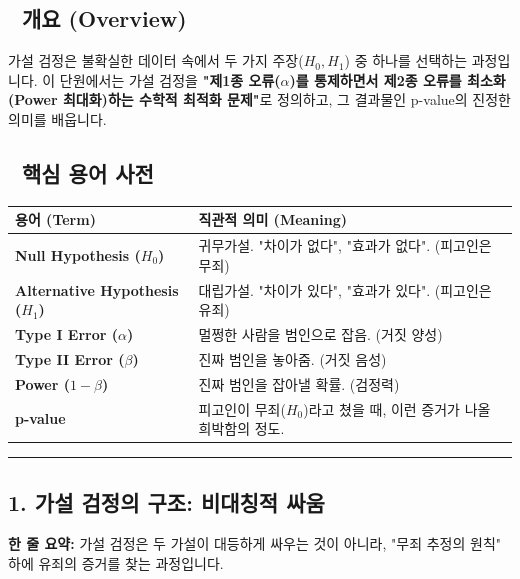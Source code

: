 \documentclass[11pt,a4paper]{book}
\theoremstyle{definition}
\begin{document}
\subsection*{📌 개요 (Overview)}
가설 검정은 불확실한 데이터 속에서 두 가지 주장($H_0, H_1$) 중 하나를 선택하는 과정입니다. 이 단원에서는 가설 검정을 \textbf{"제1종 오류($\alpha$)를 통제하면서 제2종 오류를 최소화(Power 최대화)하는 수학적 최적화 문제"}로 정의하고, 그 결과물인 p-value의 진정한 의미를 배웁니다.

\subsection*{📝 핵심 용어 사전}
\begin{table}[h]
\centering
\begin{tabularx}{\textwidth}{|p{}|X|}
\hline
\textbf{용어 (Term)} & \textbf{직관적 의미 (Meaning)} \\
\hline
\textbf{Null Hypothesis ($H_0$)} & 귀무가설. "차이가 없다", "효과가 없다". (피고인은 무죄) \\
\hline
\textbf{Alternative Hypothesis ($H_1$)} & 대립가설. "차이가 있다", "효과가 있다". (피고인은 유죄) \\
\hline
\textbf{Type I Error ($\alpha$)} & 멀쩡한 사람을 범인으로 잡음. (거짓 양성) \\
\hline
\textbf{Type II Error ($\beta$)} & 진짜 범인을 놓아줌. (거짓 음성) \\
\hline
\textbf{Power ($1-\beta$)} & 진짜 범인을 잡아낼 확률. (검정력) \\
\hline
\textbf{p-value} & 피고인이 무죄($H_0$)라고 쳤을 때, 이런 증거가 나올 희박함의 정도. \\
\hline
\end{tabularx}
\end{table}

\vspace{0.5cm}\hrule\vspace{0.5cm}

\subsection{1. 가설 검정의 구조: 비대칭적 싸움}

\begin{conceptbox}[title={개념 1: 법정 공방 (Courtroom Trial)}]
\textbf{한 줄 요약:} 가설 검정은 두 가설이 대등하게 싸우는 것이 아니라, "무죄 추정의 원칙" 하에 유죄의 증거를 찾는 과정입니다.
\end{conceptbox}
\end{document}
